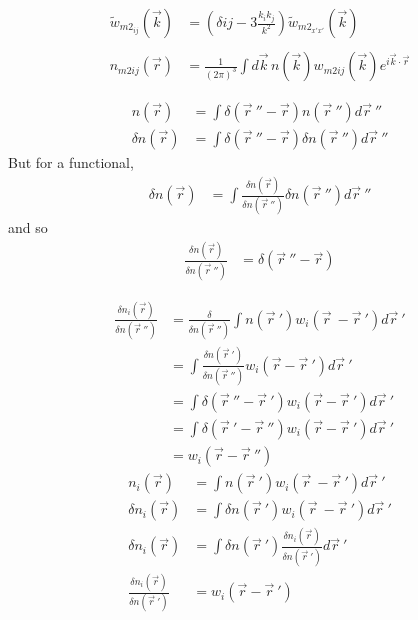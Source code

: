 \documentclass[double,12pt]{beavtex}
\begin{document}
\begin{align}
    \widetilde{w}_{m2_{ij}}(\vec{k}) &= (\delta{ij}-3\frac{k_ik_j}{k^2})
                                    \widetilde{w}_{{m2}_{x'x'}}(\vec{k}) \\ \nonumber \\
    n_{m2ij}(\vec r) &=  \frac{1}{\left(2\pi\right)^3}\int d\vec k\, 
                       n(\vec k) w_{m2ij}(\vec k)e^{i\vec k\cdot \vec r}
\end{align} 

\begin{align} 
  n(\vec r) &= \int \delta (\vec r~''-\vec r)n(\vec r~'') d\vec r~''\\
  \delta n(\vec r) &= \int \delta (\vec r~''-\vec r)\delta n(\vec r~'')
  d\vec r~''
\end{align} 
But for a functional,
\begin{align} 
\delta n(\vec r) &= \int \frac{\delta n(\vec r)}{\delta n(\vec r~'')}
\delta n(\vec r~'')d\vec r~''
\end{align} 
and so
\begin{align} 
  \frac{\delta n(\vec r)}{\delta n(\vec r~'')} &= \delta (\vec r~''-\vec r)
\end{align} 

\begin{align} 
   \frac{\delta n_i(\vec r)}{\delta n(\vec r~'')}  &= \frac{\delta}
   {\delta n(\vec r~'')}\int n(\vec r~')w_i(\vec r~-\vec r~')d\vec r~'\\
   &= \int \frac{\delta n(\vec r~')}{\delta n(\vec r~'')}w_i(\vec r
   -\vec r~') d\vec r~' \\
   &= \int \delta (\vec r~'' -\vec r~')w_i(\vec r-\vec r~') d\vec r~'\\
   &= \int \delta (\vec r~' -\vec r~'')w_i(\vec r-\vec r~') d\vec r~'\\
   &= w_i(\vec r-\vec r~'') 
\end{align}
\begin{align} 
   n_i(\vec r)  &= \int n(\vec r~')w_i(\vec r~-\vec r~')d\vec r~'\\
   \delta n_i(\vec r)  &= \int \delta n(\vec r~')w_i(\vec r~-\vec r~')d\vec r~'\\
   \delta n_i(\vec r)  &= \int \delta n(\vec r~')\frac{\delta n_i(\vec r)}{\delta n(\vec r~')}d\vec r~'\\
   \frac{\delta n_i(\vec r)}{\delta n(\vec r~')}&= w_i(\vec r-\vec r~') 
\end{align}
\end{document}
